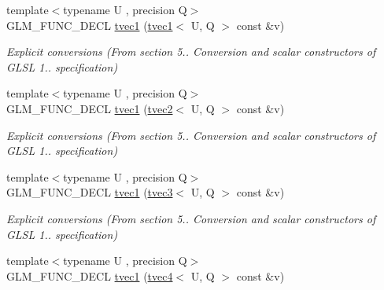 \begin{DoxyCompactItemize}
\item 
{\footnotesize template$<$typename U , precision Q$>$ }\\G\+L\+M\+\_\+\+F\+U\+N\+C\+\_\+\+D\+E\+CL \hyperlink{structglm_1_1detail_1_1tvec1_a2dd9171451398b559b398d6c540db4a7}{tvec1} (\hyperlink{structglm_1_1detail_1_1tvec1}{tvec1}$<$ U, Q $>$ const \&v)\hypertarget{structglm_1_1detail_1_1tvec1_a2dd9171451398b559b398d6c540db4a7}{}\label{structglm_1_1detail_1_1tvec1_a2dd9171451398b559b398d6c540db4a7}

\begin{DoxyCompactList}\small\item\em Explicit conversions (From section 5.. Conversion and scalar constructors of G\+L\+SL 1.. specification) \end{DoxyCompactList}\item 
{\footnotesize template$<$typename U , precision Q$>$ }\\G\+L\+M\+\_\+\+F\+U\+N\+C\+\_\+\+D\+E\+CL \hyperlink{structglm_1_1detail_1_1tvec1_a74bfab7db08f995b924a21fbf6e97158}{tvec1} (\hyperlink{structglm_1_1detail_1_1tvec2}{tvec2}$<$ U, Q $>$ const \&v)\hypertarget{structglm_1_1detail_1_1tvec1_a74bfab7db08f995b924a21fbf6e97158}{}\label{structglm_1_1detail_1_1tvec1_a74bfab7db08f995b924a21fbf6e97158}

\begin{DoxyCompactList}\small\item\em Explicit conversions (From section 5.. Conversion and scalar constructors of G\+L\+SL 1.. specification) \end{DoxyCompactList}\item 
{\footnotesize template$<$typename U , precision Q$>$ }\\G\+L\+M\+\_\+\+F\+U\+N\+C\+\_\+\+D\+E\+CL \hyperlink{structglm_1_1detail_1_1tvec1_a553b324447da4de7c371c3d109317905}{tvec1} (\hyperlink{structglm_1_1detail_1_1tvec3}{tvec3}$<$ U, Q $>$ const \&v)\hypertarget{structglm_1_1detail_1_1tvec1_a553b324447da4de7c371c3d109317905}{}\label{structglm_1_1detail_1_1tvec1_a553b324447da4de7c371c3d109317905}

\begin{DoxyCompactList}\small\item\em Explicit conversions (From section 5.. Conversion and scalar constructors of G\+L\+SL 1.. specification) \end{DoxyCompactList}\item 
{\footnotesize template$<$typename U , precision Q$>$ }\\G\+L\+M\+\_\+\+F\+U\+N\+C\+\_\+\+D\+E\+CL \hyperlink{structglm_1_1detail_1_1tvec1_afa1ae0c07774e38092fc7c016ab28a58}{tvec1} (\hyperlink{structglm_1_1detail_1_1tvec4}{tvec4}$<$ U, Q $>$ const \&v)\hypertarget{structglm_1_1detail_1_1tvec1_afa1ae0c07774e38092fc7c016ab28a58}{}\label{structglm_1_1detail_1_1tvec1_afa1ae0c07774e38092fc7c016ab28a58}


\end{DoxyCompactItemize}
